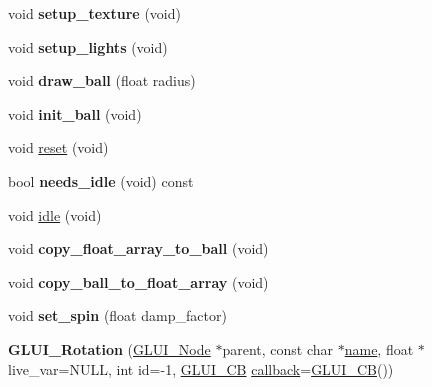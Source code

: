 \begin{DoxyCompactItemize}
\item 
\hypertarget{classGLUI__Rotation_ad8f18b5b96e4269533bd41cf1ee2d490}{void {\bfseries setup\-\_\-texture} (void)}\label{classGLUI__Rotation_ad8f18b5b96e4269533bd41cf1ee2d490}

\item 
\hypertarget{classGLUI__Rotation_a434da267e0f38a2e33c28d6d2b0742a1}{void {\bfseries setup\-\_\-lights} (void)}\label{classGLUI__Rotation_a434da267e0f38a2e33c28d6d2b0742a1}

\item 
\hypertarget{classGLUI__Rotation_a9e90fec3ccc22bcc89afd256d5842d8d}{void {\bfseries draw\-\_\-ball} (float radius)}\label{classGLUI__Rotation_a9e90fec3ccc22bcc89afd256d5842d8d}

\item 
\hypertarget{classGLUI__Rotation_a3208f44f601e410ac01745903a5bca76}{void {\bfseries init\-\_\-ball} (void)}\label{classGLUI__Rotation_a3208f44f601e410ac01745903a5bca76}

\item 
void \hyperlink{classGLUI__Rotation_ab6ce638fa62a697b3eb177a7ac879919}{reset} (void)
\item 
\hypertarget{classGLUI__Rotation_aa11e56ce208283dfcbbe67728b3de673}{bool {\bfseries needs\-\_\-idle} (void) const }\label{classGLUI__Rotation_aa11e56ce208283dfcbbe67728b3de673}

\item 
void \hyperlink{classGLUI__Rotation_a809f09063d91dcb89ea237849d5478ac}{idle} (void)
\item 
\hypertarget{classGLUI__Rotation_aea0344d014f9edafcef3f539767c5014}{void {\bfseries copy\-\_\-float\-\_\-array\-\_\-to\-\_\-ball} (void)}\label{classGLUI__Rotation_aea0344d014f9edafcef3f539767c5014}

\item 
\hypertarget{classGLUI__Rotation_a900d3fa4234a3af2e9a39686af64f37d}{void {\bfseries copy\-\_\-ball\-\_\-to\-\_\-float\-\_\-array} (void)}\label{classGLUI__Rotation_a900d3fa4234a3af2e9a39686af64f37d}

\item 
\hypertarget{classGLUI__Rotation_aac8678582493d922dc29a76f9c38adbc}{void {\bfseries set\-\_\-spin} (float damp\-\_\-factor)}\label{classGLUI__Rotation_aac8678582493d922dc29a76f9c38adbc}

\item 
\hypertarget{classGLUI__Rotation_a09fc7b3a09cbe61a5ef58d970f86adfe}{{\bfseries G\-L\-U\-I\-\_\-\-Rotation} (\hyperlink{classGLUI__Node}{G\-L\-U\-I\-\_\-\-Node} $\ast$parent, const char $\ast$\hyperlink{classGLUI__Control_aa95b97d50df45335fc33f0af03958eb3}{name}, float $\ast$live\-\_\-var=N\-U\-L\-L, int id=-\/1, \hyperlink{classGLUI__CB}{G\-L\-U\-I\-\_\-\-C\-B} \hyperlink{classGLUI__Control_a96060fe0cc6d537e736dd6eef78e24ab}{callback}=\hyperlink{classGLUI__CB}{G\-L\-U\-I\-\_\-\-C\-B}())}\label{classGLUI__Rotation_a09fc7b3a09cbe61a5ef58d970f86adfe}

\end{DoxyCompactItemize}
